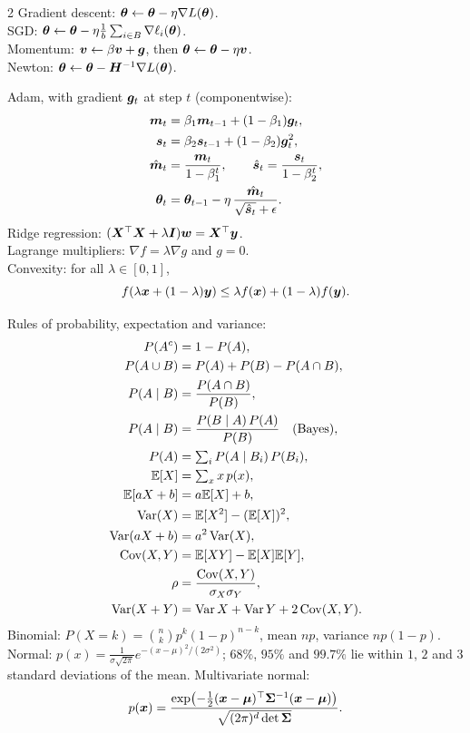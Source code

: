 \begin{multicols}{2}
Gradient descent: $\bm{\theta} \leftarrow \bm{\theta} - \eta\nabla L(\bm{\theta})$.\\
SGD: $\bm{\theta} \leftarrow \bm{\theta} - \eta\frac1b\sum_{i\in B}\nabla\ell_i(\bm{\theta})$.\\
Momentum: $\bm{v} \leftarrow \beta\bm{v} + \bm{g}$, then $\bm{\theta} \leftarrow \bm{\theta} - \eta\bm{v}$.\\
Newton: $\bm{\theta} \leftarrow \bm{\theta} - \bm{H}^{-1}\nabla L(\bm{\theta})$.\par
Adam, with gradient $\bm{g}_t$ at step $t$ (componentwise):
\begin{align*}
  \bm{m}_t &= \beta_1\bm{m}_{t-1} + (1 - \beta_1)\bm{g}_t,\\
  \bm{s}_t &= \beta_2\bm{s}_{t-1} + (1 - \beta_2)\bm{g}_t^2,\\
  \hat{\bm{m}}_t &= \frac{\bm{m}_t}{1 - \beta_1^t}, \qquad \hat{\bm{s}}_t = \frac{\bm{s}_t}{1 - \beta_2^t},\\
  \bm{\theta}_t &= \bm{\theta}_{t-1} - \eta\,\frac{\hat{\bm{m}}_t}{\sqrt{\hat{\bm{s}}_t} + \epsilon} .
\end{align*}
Ridge regression: $(\bm{X}^\top\bm{X} + \lambda\bm{I})\bm{w} = \bm{X}^\top\bm{y}$.\\
Lagrange multipliers: $\nabla f = \lambda\nabla g$ and $g = 0$.\\
Convexity: for all $\lambda \in [0, 1]$,
\[
  f(\lambda\bm{x} + (1 - \lambda)\bm{y}) \le \lambda f(\bm{x}) + (1 - \lambda)f(\bm{y}).
\]

Rules of probability, expectation and variance:
\begin{align*}
  P(A^c) &= 1 - P(A),\\
  P(A \cup B) &= P(A) + P(B) - P(A \cap B),\\
  P(A \mid B) &= \frac{P(A \cap B)}{P(B)},\\
  P(A \mid B) &= \frac{P(B \mid A)\,P(A)}{P(B)} \quad\text{(Bayes)},\\
  P(A) &= \textstyle\sum_iP(A \mid B_i)\,P(B_i),\\
  \mathbb{E}[X] &= \textstyle\sum_xx\,p(x),\\
  \mathbb{E}[aX + b] &= a\mathbb{E}[X] + b,\\
  \operatorname{Var}(X) &= \mathbb{E}[X^2] - (\mathbb{E}[X])^2,\\
  \operatorname{Var}(aX + b) &= a^2\operatorname{Var}(X),\\
  \operatorname{Cov}(X, Y) &= \mathbb{E}[XY] - \mathbb{E}[X]\mathbb{E}[Y],\\
  \rho &= \frac{\operatorname{Cov}(X, Y)}{\sigma_X\sigma_Y},\\
  \operatorname{Var}(X + Y) &= \operatorname{Var} X + \operatorname{Var} Y + 2\operatorname{Cov}(X, Y).
\end{align*}
Binomial: $P(X = k) = \binom nk p^k(1 - p)^{n-k}$, mean $np$, variance $np(1 - p)$.
Normal: $p(x) = \frac{1}{\sigma\sqrt{2\pi}}e^{-(x - \mu)^2/(2\sigma^2)}$; $68\%$, $95\%$
and $99.7\%$ lie within $1$, $2$ and $3$ standard deviations of the mean.
Multivariate normal:
\[
  p(\bm{x}) = \frac{\exp\bigl(-\frac12(\bm{x} - \bm{\mu})^\top\bm{\Sigma}^{-1}(\bm{x} - \bm{\mu})\bigr)}
  {\sqrt{(2\pi)^d\det\bm{\Sigma}}} .
\]


\end{multicols}
